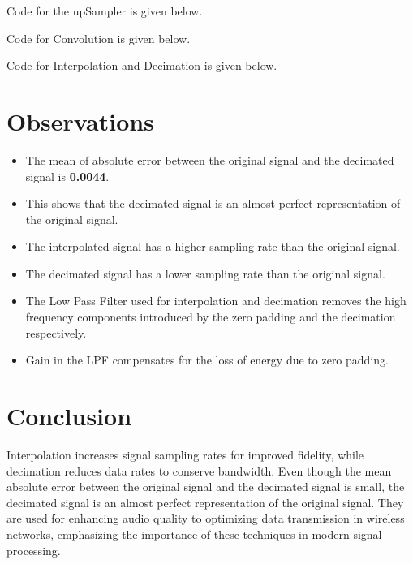 \documentclass[a4paper,12pt]{article}
\begin{document}
Code for the upSampler is given below.


Code for Convolution is given below.


Code for Interpolation and Decimation is given below.


\section*{Observations}
\begin{itemize}
    \item The mean of absolute error between the original signal and the decimated signal is \textbf{0.0044}.
    \item This shows that the decimated signal is an almost perfect representation of the original signal.
    \item The interpolated signal has a higher sampling rate than the original signal.
    \item The decimated signal has a lower sampling rate than the original signal.
    \item The Low Pass Filter used for interpolation and decimation removes the high frequency components introduced by the zero padding and the decimation respectively.
    \item Gain in the LPF compensates for the loss of energy due to zero padding.
\end{itemize}

\section*{Conclusion}
Interpolation increases signal sampling rates for improved fidelity, while decimation reduces data rates to conserve bandwidth.
Even though the mean absolute error between the original signal and 
the decimated signal is small, the decimated signal is an almost perfect 
representation of the original signal.
They are used for enhancing audio quality to optimizing data transmission in wireless 
networks, emphasizing the importance of these techniques in modern signal processing.
\end{document}
